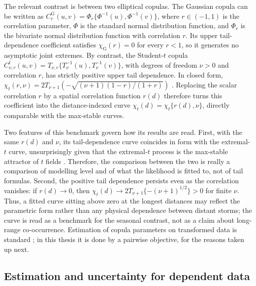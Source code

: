 The relevant contrast is between two elliptical copulas. The Gaussian copula can be written as \(C^{\mathrm G}_{r}(u,v)=\Phi_{r}\{\Phi^{-1}(u),\Phi^{-1}(v)\}\), where \(r\in(-1,1)\) is the correlation parameter, \(\Phi\) is the standard normal distribution function, and \(\Phi_r\) is the bivariate normal distribution function with correlation \(r\). Its upper tail-dependence coefficient satisfies \(\chi_{\mathrm G}(r)=0\) for every \(r<1\), so it generates no asymptotic joint extremes. By contrast, the Student-\(t\) copula \(C^{t}_{\nu,r}(u,v)=T_{\nu,r}\{T_{\nu}^{-1}(u),T_{\nu}^{-1}(v)\}\), with degrees of freedom \(\nu>0\) and correlation \(r\), has strictly positive upper tail dependence. In closed form, \(\chi_t(r,\nu)=2T_{\nu+1}\left(-\sqrt{(\nu+1)(1-r)/(1+r)}\right)\) \citep{demarta2005}. Replacing the scalar correlation \(r\) by a spatial correlation function \(r(d)\) therefore turns this coefficient into the distance-indexed curve \(\chi_t(d)=\chi_t\{r(d),\nu\}\), directly comparable with the max-stable curves.

Two features of this benchmark govern how its results are read. First, with the same \(r(d)\) and \(\nu\), its tail-dependence curve coincides in form with the extremal-\(t\) curve, unsurprisingly given that the extremal-\(t\) process is the max-stable attractor of \(t\) fields \citep{nikoloulopoulos2009}. Therefore, the comparison between the two is really a comparison of modelling level and of what the likelihood is fitted to, not of tail formulas. Second, the positive tail dependence persists even as the correlation vanishes: if \(r(d)\to0\), then \(\chi_t(d)\to 2T_{\nu+1}\{-(\nu+1)^{1/2}\}>0\) for finite \(\nu\). Thus, a fitted curve sitting above zero at the longest distances may reflect the parametric form rather than any physical dependence between distant storms; the curve is read as a benchmark for the seasonal contrast, not as a claim about long-range co-occurrence. Estimation of copula parameters on transformed data is standard \citep{genest1995}; in this thesis it is done by a pairwise objective, for the reasons taken up next.

\subsection{Estimation and uncertainty for dependent data}\label{sec:lit-cl}\label{sec:lit-inference}\label{sec:lit-temporal}

